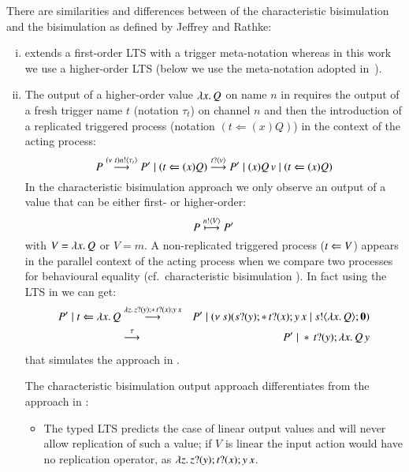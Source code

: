 There are similarities and differences between of the characteristic bisimulation
and the bisimulation as defined by Jeffrey and Rathke:
%
\begin{enumerate}[i)]
	\item	\cite{DBLP:journals/lmcs/JeffreyR05} extends a first-order
		LTS with a trigger meta-notation whereas in this
		work we use a higher-order LTS
		(below we use the meta-notation adopted in~\cite{DBLP:journals/lmcs/JeffreyR05}).

	\item	The output of a higher-order value $\lambda x.\,Q$ on name
		$n$ in \cite{DBLP:journals/lmcs/JeffreyR05}
		requires the output of
		a fresh trigger name $t$ (notation $\tau_t$)
		on channel $n$ 
		and then the introduction of a replicated triggered process
		(notation $(t \Leftarrow (x) Q)$)
		in the context of the acting process:
		\[
			P \stackrel{(\nu\ t) n ! \langle \tau_{t} \rangle}{\longrightarrow} P' \;|\; (t \Leftarrow (x) Q) \stackrel{t ? \langle v \rangle}{\longrightarrow} P' \;|\; (x) Q\,v \;|\; (t \Leftarrow (x) Q) 
		\]
		In the characteristic bisimulation approach we only observe
		an output of a value that can be either first- or higher-order:
		\[
			P \stackrel{n ! \langle V \rangle}{\longmapsto} P' 
		\]
		with $V = \lambda x.\,Q$ or $V = m$.
		A non-replicated triggered process ($t \Leftarrow V$)
		appears in
		the parallel context of the acting process when
		we compare two processes for behavioural equality
		(cf.~characteristic bisimulation ).
		In fact using the LTS in
		 we can get:
		\begin{eqnarray*}
			P' \;|\; t \Leftarrow \lambda x.\,Q
			&\stackrel{\lambda z.\,z ? (y) ; \ast\,{} t ? (x) ; y\,x}{\longrightarrow}&
			P' \;|\; (\nu\ s)(s ? (y) ; \ast\,{} t ? (x) ; y\,x \;|\; s ! \langle \lambda x.\,Q \rangle ; \mathbf{0})\\
			&\stackrel{\tau}{\longrightarrow}&
			P' \;|\; \ast\,{}t ? (y) ; \lambda x.\,Q\,y
		\end{eqnarray*}
		that simulates the approach in \cite{DBLP:journals/lmcs/JeffreyR05}.

		The characteristic bisimulation output approach differentiates from
		the approach in \cite{DBLP:journals/lmcs/JeffreyR05}:
		\begin{itemize}
			\item	The typed LTS predicts the case of linear
				output values and will never allow replication
				of such a value;
				if $V$ is linear the input action would have no replication
				operator, as
				$\lambda z.\,z ? (y) ; t ? (x) ; y\,x$.


\end{itemize}
\end{enumerate}

